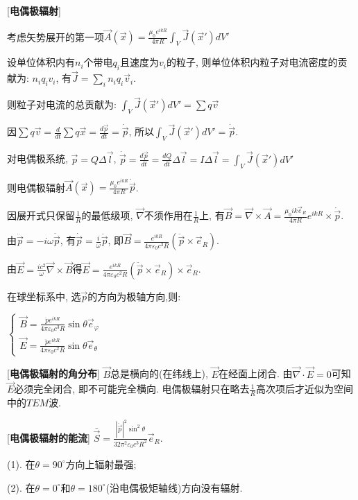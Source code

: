 [\textbf{电偶极辐射}] \par
\qquad 考虑矢势展开的第一项$\vec A(\vec x)=\frac{\mu_0e^{ikR}}{4\pi R}\int_V\vec J(\vec x')dV'$\par
\qquad 设单位体积内有$n_i$个带电$q_i$且速度为$v_i$的粒子, 则单位体积内粒子对电流密度的贡献为: $n_iq_iv_i$, 有$\vec J=\sum\limits_i n_iq_i\vec v_i$.\par
\qquad \qquad 则粒子对电流的总贡献为: $\int_V\vec J(\vec x')dV'=\sum q\vec v$\par
\qquad 因$\sum q\vec v=\frac{d}{dt}\sum q\vec x=\frac{d\vec p}{dt}=\dot {\vec p}$, 所以$\int_V\vec J(\vec x')dV'=\dot{\vec p}$.\par
\qquad 对电偶极系统, $\vec p=Q\Delta\vec l$, $\dot{\vec p}=\frac{d\vec p}{dt}=\frac{dQ}{dt}\Delta\vec l=I\Delta\vec l=\int_V\vec J(\vec x')dV'$\par
\qquad \qquad 则电偶极辐射$\vec A(\vec x)=\frac{\mu_0e^{ikR}}{4\pi R}\dot{\vec p}$.\par
\qquad 因展开式只保留$\frac{1}{R}$的最低级项, $\vec\nabla$不须作用在$\frac{1}{R}$上, 有$\vec B=\vec\nabla\times\vec A=\frac{\mu_0ik\vec e_R}{4\pi R}e^{ikR}\times\dot{\vec p}$.\par
\qquad 由$\ddot{\vec p}=-i\omega\dot{\vec p}$, 有$\dot{\vec p}=\frac{i}{\omega}\ddot{\vec p}$, 即$\vec B=\frac{e^{ikR}}{4\pi\varepsilon_0c^3R}\left(\ddot{\vec p}\times\vec e_R\right)$.\par
\qquad 由$\vec E=\frac{ic^2}{\omega}\vec\nabla\times\vec B$得$\vec E=\frac{e^{ikR}}{4\pi\varepsilon_0c^2R}\left(\ddot{\vec p}\times\vec e_R\right)\times\vec e_R$.\par
\qquad 在球坐标系中, 选$\vec p$的方向为极轴方向,则:\par
\qquad \qquad $\begin{cases}\vec B=\frac{\ddot pe^{ikR}}{4\pi\varepsilon_0c^3R}\sin\theta\vec e_\varphi\\\vec E=\frac{\ddot pe^{ikR}}{4\pi\varepsilon_0c^2R}\sin\theta\vec e_\theta\end{cases}$

[\textbf{电偶极辐射的角分布}] $\vec B$总是横向的(在纬线上), $\vec E$在经面上闭合. 由$\vec\nabla\cdot\vec E=0$可知$\vec E$必须完全闭合, 即不可能完全横向. 电偶极辐射只在略去$\frac{1}{R}$高次项后才近似为空间中的$TEM$波.

[\textbf{电偶极辐射的能流}] $\bar{\vec S}=\frac{|\ddot{\vec p}|^2\sin^2\theta}{32\pi^2\varepsilon_0c^3R^2}\vec e_R$.\par
\qquad (1). 在$\theta=90^\circ$方向上辐射最强;\par
\qquad (2). 在$\theta=0^\circ$和$\theta=180^\circ$(沿电偶极矩轴线)方向没有辐射.\par

